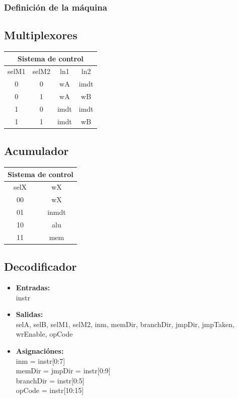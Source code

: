 \documentclass[paper=letter, fontsize=12pt]{article}
\begin{document}
\pagebreak
\subsubsection{Definición de la máquina}

\subsection{Multiplexores}

\begin{table}[h]
\centering
\begin{tabular}{cc|cc}
\multicolumn{4}{c}{Sistema de control} \\ \hline
selM1 & selM2 & ln1 	& ln2  \\ \hline
0     & 0     & wA 	& imdt \\
0     & 1     & wA	& wB   \\
1     & 0     & imdt	& imdt \\
1     & 1     & imdt	& wB   \\
\end{tabular}
\end{table}

\subsection{Acumulador}

\begin{table}[h]
\centering
\begin{tabular}{c|c}
\multicolumn{2}{c}{Sistema de control} \\ \hline
selX   & wX    \\ \hline
00     & wX    \\
01     & inmdt \\
10     & alu   \\
11     & mem   \\
\end{tabular}
\end{table}


\pagebreak
\subsection{Decodificador}

\begin{itemize}
\item \textbf{Entradas:}\\
instr
\item \textbf{Salidas:}\\
selA, selB, selM1, selM2, inm, memDir, branchDir, jmpDir, jmpTaken, wrEnable, opCode
\item \textbf{Asignaciónes:} \\
inm = instr[0:7] \\
memDir = jmpDir = instr[0:9] \\
branchDir = instr[0:5] \\
opCode = instr[10:15]
\end{itemize}
\end{document}
